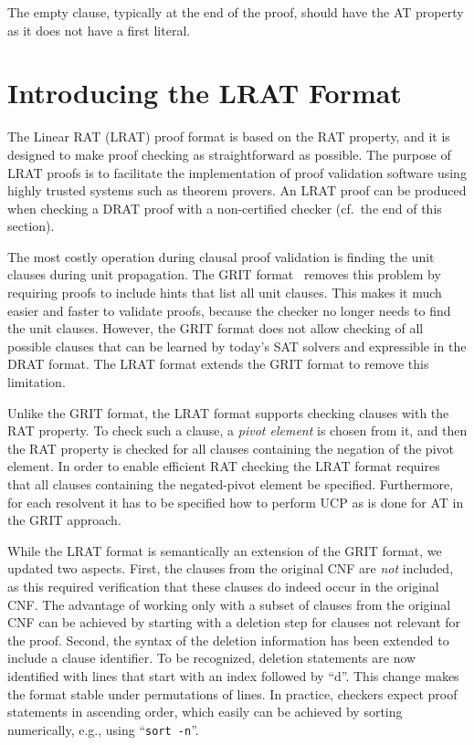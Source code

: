 \documentclass{article}
\begin{document}
The empty clause, typically at the end of the proof, should have the AT property
as it does not have a first literal.

\section{Introducing the LRAT Format}
\label{sec:lrat}

The Linear RAT (LRAT) proof format is based on the
RAT property, and it is designed to make proof
checking as straightforward as possible.  The purpose of LRAT proofs
is to facilitate the implementation of proof validation software
using highly trusted systems such as theorem provers.
%
An LRAT proof can be produced when checking a DRAT proof
%
with a non-certified checker (cf.\ the end of this section).

The most costly operation during clausal proof validation is finding
the unit clauses during unit propagation.  The GRIT format~\cite{grit}
removes this problem by requiring proofs to include hints that list
all unit clauses.  This makes it much easier and faster to validate
proofs, because the checker no longer needs to find the unit clauses.
However, the GRIT format does not allow checking of all possible clauses that
can be learned by today's SAT solvers and expressible in the DRAT format.  The LRAT format extends the
GRIT format to remove this limitation.
%
%
%
%
%

Unlike the GRIT format, the LRAT format supports checking clauses with
the RAT property.  To check such a
clause, a {\em pivot element} is chosen from it, and
%
%
%
%
%
%
%
%
then the RAT property is checked for all clauses containing the
negation of the pivot element.  In order to enable efficient RAT checking
the LRAT format requires that all clauses containing the negated-pivot
element be specified.  Furthermore, for each resolvent it has to be
specified how to perform UCP as is done for AT in the GRIT approach.

While the LRAT format is semantically an extension of the GRIT format,
we updated two aspects.  First, the clauses from the original CNF are
\emph{not} included, as this required verification that these clauses
do indeed occur in the original CNF.  The advantage of working only
with a subset of clauses from the original CNF can be achieved by
starting with a deletion step for clauses not
relevant for the proof.  Second, the syntax of the deletion
information has been extended to include a clause identifier.  To be recognized,
deletion statements are now identified with lines that start with
an index followed by ``d''.
%
%
%
%
This change makes the format stable
under permutations of lines.  In practice, checkers expect proof
statements in ascending order, which easily can be achieved by sorting
numerically, e.g., using ``\texttt{sort -n}''.
\end{document}
